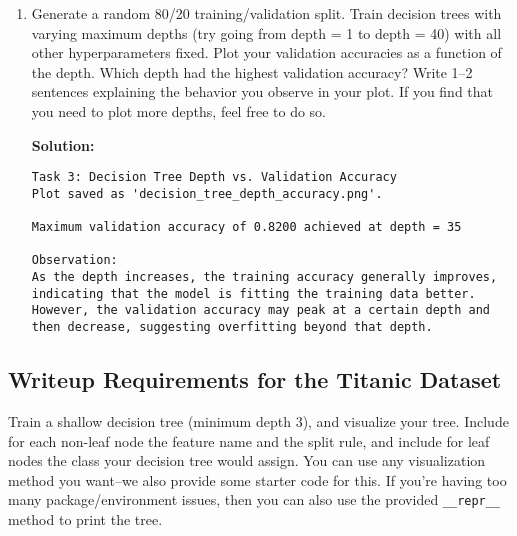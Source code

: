 \documentclass{article}
\newenvironment{solution}{\color{blue} \smallskip \textbf{Solution:}}{}
\begin{document}
\begin{enumerate}
	\begin{solution}
\begin{verbatim}
Task 2: Most Common Splits at Root Node in Random Forest
Most Common Root Splits:
Feature: money (15 trees)
Feature: meter (15 trees)
Feature: exclamation (13 trees)
Feature: pain (8 trees)
Feature: volumes (8 trees)
Feature: featured (8 trees)
Feature: ampersand (7 trees)
Feature: parenthesis (5 trees)
Feature: dollar (4 trees)
Feature: creative (4 trees)
Feature: spam (3 trees)
Feature: prescription (3 trees)
Feature: private (2 trees)
Feature: sharp (2 trees)
Feature: differ (1 trees)
Feature: width (1 trees)
Feature: other (1 trees)
\end{verbatim}
	\end{solution}

	
	\item 
    Generate a random 80/20 training/validation split. 
    Train decision trees with varying maximum depths (try going from depth = 1 to depth = 40) with all other hyperparameters fixed. 
    Plot your validation accuracies as a function of the depth. 
    Which depth had the highest validation accuracy? 
    Write 1--2 sentences explaining the behavior you observe in your plot. 
    If you find that you need to plot more depths, feel free to do so.

    \begin{solution}

\begin{verbatim}
Task 3: Decision Tree Depth vs. Validation Accuracy
Plot saved as 'decision_tree_depth_accuracy.png'.

Maximum validation accuracy of 0.8200 achieved at depth = 35

Observation:
As the depth increases, the training accuracy generally improves, indicating that the model is fitting the training data better.
However, the validation accuracy may peak at a certain depth and then decrease, suggesting overfitting beyond that depth.

\end{verbatim}




    \end{solution}
\end{enumerate}

\newpage
\subsection{Writeup Requirements for the Titanic Dataset}
Train a shallow decision tree (minimum depth $3$), and visualize your tree. 
Include for each non-leaf node the feature name and the split rule, and include for leaf nodes the class your decision tree would assign. 
You can use any visualization method you want--we also provide some starter code for this. 
If you're having too many package/environment issues, then you can also use the provided \verb|__repr__| method to print the tree.
	
\end{document}
